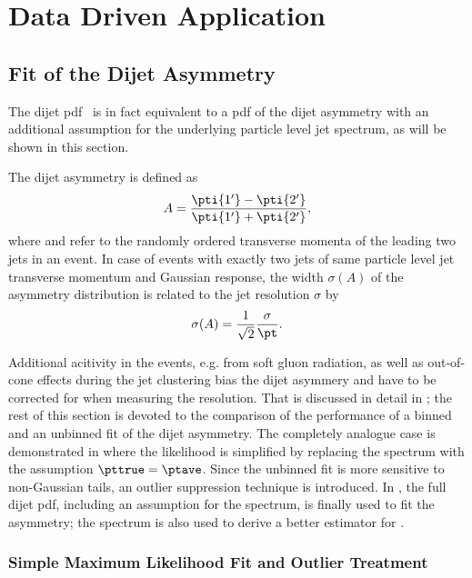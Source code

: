 \section{Data Driven Application}


\subsection{Fit of the Dijet Asymmetry}

The dijet pdf~ is in fact equivalent to a pdf of the dijet
asymmetry with an additional assumption for the underlying particle
level jet spectrum, as will be shown in this section.

The dijet asymmetry is defined as
\begin{equation}\label{eq:ResFit:Asymmetry}
  A = \frac{\pti{1'}-\pti{2'}}{\pti{1'}+\pti{2'}},
\end{equation}
where  and  refer to the randomly ordered transverse momenta of the
leading two jets in an event.
In case of events with exactly two jets of same particle level jet
transverse momentum \pt and Gaussian response, the width $\sigma(A)$ of the asymmetry distribution is
related to the jet \pt resolution $\sigma$ by
\begin{equation}
  \label{eq:ResFit:ResFromAsym}
  \sigma(A) = \frac{1}{\sqrt{2}}\frac{\sigma}{\pt}.
\end{equation}

Additional acitivity in the events, e.g. from soft gluon radiation, as
well as out-of-cone effects during the jet clustering bias the dijet asymmery and have to be
corrected for when measuring the resolution.
That is discussed in detail in ; the rest of
this section is devoted to the comparison of the performance of a
binned and an unbinned fit of the dijet asymmetry.
The completely analogue case is demonstrated in
 where the likelihood is simplified by replacing the spectrum
with the assumption \mbox{$\pttrue = \ptave$}.
Since the unbinned fit is more sensitive to non-Gaussian tails, an outlier
suppression technique is introduced.
In , the full dijet pdf, including an assumption for the
spectrum, is finally used to fit the asymmetry;
the spectrum is also used to derive a better estimator for \ptgen.


\subsubsection{Simple Maximum Likelihood Fit and Outlier Treatment}\label{sec:ResFit:Asym:SimpleFit}

